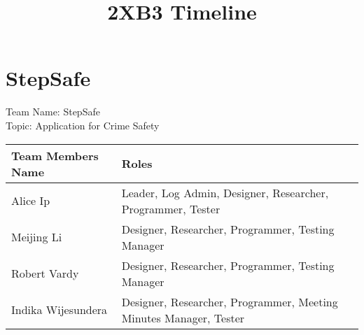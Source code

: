 \documentclass[10pt]{article}
\begin{document}
\title{2XB3 Timeline}
\maketitle

\section {StepSafe}
Team Name: StepSafe \\
Topic: Application for Crime Safety \\

 \begin{tabular}{|p{4cm}| p{10cm}|} 
 \hline
 Team Members Name & Roles \\
 \hline
  Alice Ip & Leader, Log Admin, Designer, Researcher, Programmer, Tester  \\
 \hline
  Meijing Li & Designer, Researcher, Programmer, Testing Manager  \\
 \hline
  Robert Vardy & Designer, Researcher, Programmer, Testing Manager  \\
 \hline
  Indika Wijesundera & Designer, Researcher, Programmer, Meeting Minutes Manager, Tester  \\
 \hline
 
\end{tabular} \\
\end{document}
